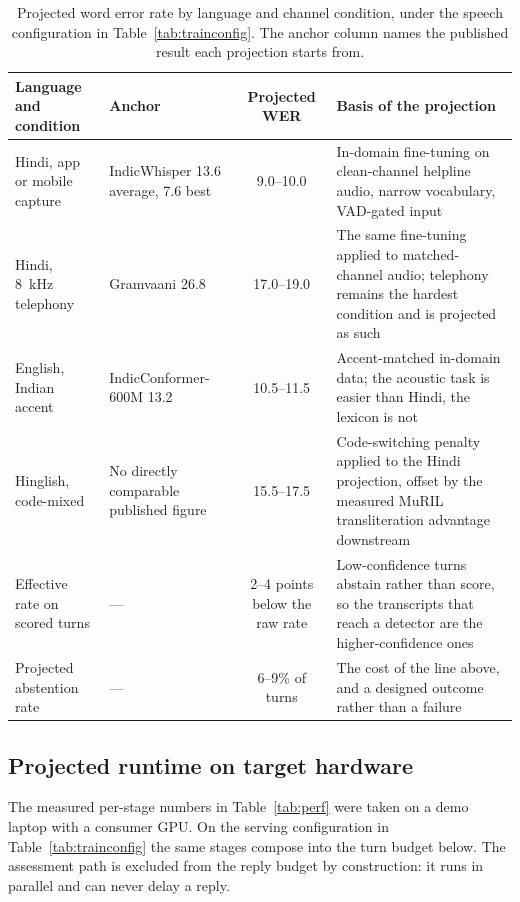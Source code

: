 \documentclass[11pt,a4paper]{article}
\begin{document}
\begin{table}[!htbp]
\centering\footnotesize
\caption{Projected word error rate by language and channel condition, under the speech configuration
in Table~\ref{tab:trainconfig}. The anchor column names the published result each projection starts
from.}
\label{tab:projasr}
\begin{tabularx}{\linewidth}{@{}>{\raggedright\arraybackslash}p{4.0cm}>{\raggedright\arraybackslash}p{3.4cm}cX@{}}
\toprule
Language and condition & Anchor & Projected WER & Basis of the projection \\
\midrule
Hindi, app or mobile capture & IndicWhisper 13.6 average, 7.6 best~\cite{vistaar} & 9.0--10.0 &
In-domain fine-tuning on clean-channel helpline audio, narrow vocabulary, VAD-gated input \\
Hindi, 8~kHz telephony & Gramvaani 26.8~\cite{vistaar} & 17.0--19.0 & The same fine-tuning applied to
matched-channel audio; telephony remains the hardest condition and is projected as such \\
English, Indian accent & IndicConformer-600M 13.2~\cite{indicconformer} & 10.5--11.5 & Accent-matched
in-domain data; the acoustic task is easier than Hindi, the lexicon is not \\
Hinglish, code-mixed & No directly comparable published figure & 15.5--17.5 & Code-switching penalty
applied to the Hindi projection, offset by the measured MuRIL transliteration advantage downstream \\
Effective rate on scored turns & --- & 2--4 points below the raw rate & Low-confidence turns abstain
rather than score, so the transcripts that reach a detector are the higher-confidence ones \\
Projected abstention rate & --- & 6--9\% of turns & The cost of the line above, and a designed
outcome rather than a failure \\
\bottomrule
\end{tabularx}
\end{table}

\subsection{Projected runtime on target hardware}
The measured per-stage numbers in Table~\ref{tab:perf} were taken on a demo laptop with a consumer
GPU. On the serving configuration in Table~\ref{tab:trainconfig} the same stages compose into the
turn budget below. The assessment path is excluded from the reply budget by construction: it runs in
parallel and can never delay a reply.
\end{document}
